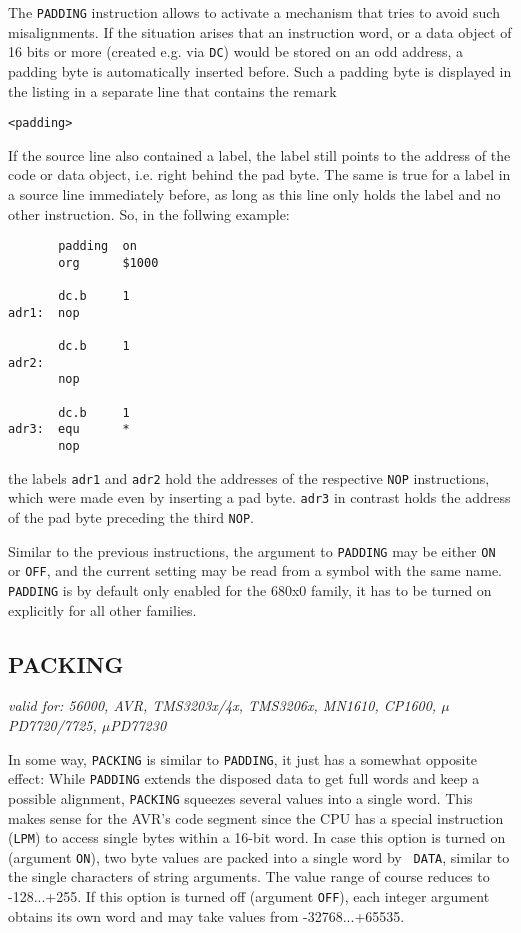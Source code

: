 \documentclass[12pt,twoside]{report}
\makeatletter
\newcommand{\tty}[1]{{\tt #1}}
\newcommand{\ttindex}[1]{\index{#1@{\tt #1}}}
\makeatother
\begin{document}
The \tty{PADDING} instruction allows to activate a mechanism that tries to
avoid such misalignments.  If the situation arises that an instruction
word, or a data object of 16 bits or more (created e.g. via \tty{DC}) would
be stored on an odd address, a padding byte is automatically inserted before.
Such a padding byte is displayed in the listing in a separate line that
contains the remark
\begin{verbatim}
<padding>
\end{verbatim}
If the source line also contained a label, the label still points to the
address of the code or data object, i.e. right behind the pad byte.  The same
is true for a label in a source line immediately before, as long as this
line {\em} only holds the label and no other instruction.  So, in the
follwing example:
\begin{verbatim}
       padding  on
       org      $1000

       dc.b     1
adr1:  nop

       dc.b     1
adr2:
       nop

       dc.b     1
adr3:  equ      *
       nop
\end{verbatim}
the labels \tty{adr1} and \tty{adr2} hold the addresses of the respective
\tty{NOP} instructions, which were made even by inserting a pad byte.
\tty{adr3} in contrast holds the address of the pad byte preceding the
third \tty{NOP}.

Similar to the previous instructions, the argument to \tty{PADDING} may be
either \tty{ON} or \tty{OFF}, and the current setting may be read from a
symbol with the same name.  \tty{PADDING} is by default only enabled for
the 680x0 family, it has to be turned on explicitly for all other families.


\subsection{PACKING}
\ttindex{PACKING}\label{SectPACKING}

{\em valid for: 56000, AVR, TMS3203x/4x, TMS3206x, MN1610, CP1600,
     $\mu$PD7720/7725, $\mu$PD77230}

In some way, {\tt PACKING} is similar to {\tt PADDING}, it just has a
somewhat opposite effect: While {\tt PADDING} extends the disposed data to
get full words and keep a possible alignment, {\tt PACKING} squeezes
several values into a single word.  This makes sense for the AVR's code
segment since the CPU has a special instruction ({\tt LPM}) to access
single bytes within a 16-bit word.  In case this option is turned on
(argument {\tt ON}), two byte values are packed into a single word by {\tt
DATA}, similar to the single characters of string arguments.  The value
range of course reduces to -128...+255.  If this option is turned off
(argument {\tt OFF}), each integer argument obtains its own word and may
take values from -32768...+65535.
\end{document}
